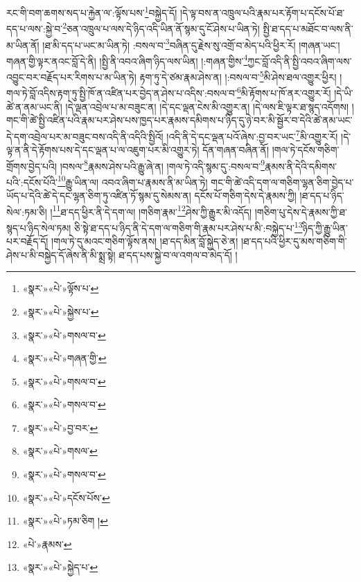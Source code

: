 རང་གི་བག་ཆགས་སད་པ་རྐྱེན་ལ་:ལྟོས་པས་\footnote{«སྣར་»«པེ་»ལྟོས་པ་}བསྐྱེད་དོ། །དེ་ལྟ་བས་ན་འཁྲུལ་པའི་རྣམ་པར་རྟོག་པ་དངོས་པོ་ཐ་དད་པ་ལས་:སྐྱེ་བ་\footnote{«སྣར་»«པེ་»སྐྱེས་པ་}ཅན་འཁྲུལ་པ་ལས་དེ་ཉིད་འདི་ཡིན་ནོ་སྙམ་དུ་ངོ་ཤེས་པ་ཡིན་ཏེ། སྤྱི་ཐ་དད་པ་མཐོང་བ་ལས་ནི་མ་ཡིན་ནོ། །ཐ་མི་དད་པ་ཡང་མ་ཡིན་ཏེ། :བསལ་བ་\footnote{«སྣར་»«པེ་»གསལ་བ་}བཞིན་དུ་རྗེས་སུ་འགྲོ་བ་མེད་པའི་ཕྱིར་རོ། །གཞན་ཡང་། གཞན་གྱི་ལྟར་ནའང་བློ་དེ་ནི། །སྤྱི་ནི་འབའ་ཞིག་ཉིད་ལས་ཡིན། །:གཞན་གྱིས་\footnote{«སྣར་»«པེ་»གཞན་གྱི་}ཀྱང་བློ་འདི་ནི་སྤྱི་འབའ་ཞིག་ལས་འབྱུང་བར་བརྗོད་པར་རིགས་པ་མ་ཡིན་ཏེ། རྟག་ཏུ་དེ་ཙམ་རྣམ་ཤེས་ན། །:བསལ་བ་\footnote{«སྣར་»«པེ་»གསལ་བ་}མི་ཤེས་ཐལ་འགྱུར་ཕྱིར། །གལ་ཏེ་བློ་འདིས་རྟག་ཏུ་སྤྱི་ཁོ་ན་འཛིན་པར་བྱེད་ན་ཤེས་པ་འདིས་:བསལ་བ་\footnote{«སྣར་»«པེ་»གསལ་བ་}མི་རྟོགས་པ་ཁོ་ནར་འགྱུར་རོ། །དེ་ཡི་ཚེ་ན་ནམ་ཡང་ནི། །དེ་ལྡན་འབྲེལ་པ་མ་བཟུང་ན། །དེ་དང་ལྡན་ངེས་མི་འགྱུར་ན། །དེ་ལས་ཇི་ལྟར་ཐ་སྙད་འདོགས། །གང་གི་ཚེ་སྤྱི་འཛིན་པའི་རྣམ་པར་ཤེས་པས་ཁྱད་པར་རྣམས་དམིགས་པ་ཉིད་དུ་ཉེ་བར་མི་སྦྱོར་བ་དེའི་ཚེ་ནམ་ཡང་དེ་དག་འབྲེལ་པར་མ་བཟུང་བས་འདི་ནི་འདིའི་སྤྱིའོ། །འདི་ནི་དེ་དང་ལྡན་པའོ་ཞེས་:བྱ་བར་ཡང་\footnote{«སྣར་»«པེ་»བྱ་བར་}མི་འགྱུར་རོ། །དེ་ལྟ་ན་ནི་དེ་རྟོགས་པས་དེ་དང་ལྡན་པ་ལ་འཇུག་པར་མི་འགྱུར་ཏེ། དོན་གཞན་བཞིན་ནོ། །གལ་ཏེ་དངོས་གཅིག་གྲོགས་བྱེད་པའི། །བསལ་\footnote{«སྣར་»«པེ་»གསལ་}རྣམས་ཤེས་པའི་རྒྱུ་ཞེ་ན། །གལ་ཏེ་འདི་སྙམ་དུ་:བསལ་བ་\footnote{«སྣར་»«པེ་»གསལ་བ་}རྣམས་ནི་དེའི་དམིགས་པའི་:དངོས་པོའི་\footnote{«སྣར་»«པེ་»དངོས་པོས་}རྒྱུ་ཡིན་ལ། འབའ་ཞིག་པ་རྣམས་ནི་མ་ཡིན་ཏེ། གང་གི་ཚེ་འདི་དག་ལ་གཅིག་ལྷན་ཅིག་བྱེད་པ་ཡོད་པ་དེའི་ཚེ་དེ་དང་ལྷན་ཅིག་ཏུ་འཛིན་ཏོ་སྙམ་དུ་སེམས་ན། དངོས་པོ་གཅིག་དེས་དེ་རྣམས་ཀྱི། །ཐ་དད་པ་ཉིད་སེལ་:ཏམ་ཅི། །\footnote{«སྣར་»«པེ་»ཏམ་ཅིག །}ཐ་དད་ཕྱིར་ནི་དེ་དག་ལ། །གཅིག་རྣམ་\footnote{«པེ་»རྣམས་}ཤེས་ཀྱི་རྒྱུར་མི་འདོད། །གཅིག་པུ་དེས་དེ་རྣམས་ཀྱི་ཐ་སྙད་པ་ཉིད་སེལ་ཏམ། ཅི་སྟེ་ཐ་དད་པ་ཉིད་ནི་དེ་དག་ལ་གཅིག་གི་རྣམ་པར་ཤེས་པ་མི་:བསྐྱེད་པ་\footnote{«སྣར་»«པེ་»སྐྱེད་པ་}ཉིད་ཀྱི་རྒྱུ་ཡིན་པར་བརྗོད་དོ། །གལ་ཏེ་དུ་མའང་གཅིག་ལྟོས་ནས། །ཐ་དད་མིན་བློ་སྐྱེད་ཅེ་ན། །ཐ་དད་པའི་ཕྱིར་དུ་མས་གཅིག་གི་ཤེས་པ་མི་བསྐྱེད་དོ་ཞེས་ནི་མི་སྨྲ་སྟེ། ཐ་དད་པས་སྐྱེ་བ་ལ་འགལ་བ་མེད་དོ། །
